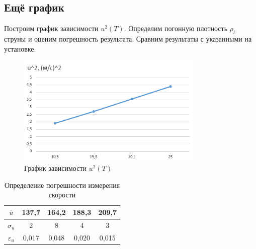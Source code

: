\documentclass[13pt,a4paper]{article}
\begin{document}
\subsection{Ещё график}
Построим график зависимости $u^2(T)$. Определим погонную плотность $\rho_{l}$ струны и оценим погрешность результата. Сравним результаты с указанными на установке.
\begin{figure}[h!]
	\begin{center}
		\includegraphics[width = 0.8\textwidth]{u2t}
		\caption{График зависимости $u^2(T)$}
		\label{fig:u2t}
	\end{center}
\end{figure}

\begin{minipage}[h]{2\textwidth}

\end{minipage}

\begin{table}[h]
\centering
\begin{tabular}{|c|c|c|c|c|}
\hline
$\overline{u}$  & 137,7 & 164,2 & 188,3 & 209,7 \\ \hline
$\sigma_{u}$     & 2   & 8   & 4   & 3  \\ \hline
$\varepsilon_{u}$   & 0,017 & 0,048 & 0,020 & 0,015\\ \hline
\end{tabular}
\caption{Определение погрешности измерения скорости}
\label{tab:velocity_with_mistakes}
\end{table}
\end{document}
